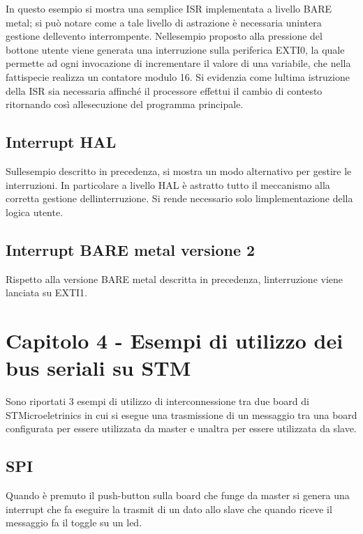 In questo esempio si mostra una semplice I\+SR implementata a livello B\+A\+RE metal; si può notare come a tale livello di astrazione è necessaria un\textquotesingle{}intera gestione dell\textquotesingle{}evento interrompente. Nell\textquotesingle{}esempio proposto alla pressione del bottone utente viene generata una interruzione sulla periferica E\+X\+T\+I0, la quale permette ad ogni invocazione di incrementare il valore di una variabile, che nella fattispecie realizza un contatore modulo 16. Si evidenzia come l\textquotesingle{}ultima istruzione della I\+SR sia necessaria affinché il processore effettui il cambio di contesto ritornando così all\textquotesingle{}esecuzione del programma principale. \hypertarget{index_thirthsecond}{}\subsection{Interrupt H\+AL}\label{index_thirthsecond}
Sull\textquotesingle{}esempio descritto in precedenza, si mostra un modo alternativo per gestire le interruzioni. In particolare a livello H\+AL è astratto tutto il meccanismo alla corretta gestione dell\textquotesingle{}interruzione. Si rende necessario solo l\textquotesingle{}implementazione della logica utente. \hypertarget{index_thirtthirth}{}\subsection{Interrupt B\+A\+R\+E metal versione 2}\label{index_thirtthirth}
Rispetto alla versione B\+A\+RE metal descritta in precedenza, l\textquotesingle{}interruzione viene lanciata su E\+X\+T\+I1.\hypertarget{index_fourth}{}\section{Capitolo 4 -\/  Esempi di utilizzo dei bus seriali su S\+TM}\label{index_fourth}
Sono riportati 3 esempi di utilizzo di interconnessione tra due board di S\+T\+Microeletrinics in cui si esegue una trasmissione di un messaggio tra una board configurata per essere utilizzata da master e un\textquotesingle{}altra per essere utilizzata da slave. \hypertarget{index_fourthone}{}\subsection{S\+PI}\label{index_fourthone}
Quando è premuto il push-\/button sulla board che funge da master si genera una interrupt che fa eseguire la trasmit di un dato allo slave che quando riceve il messaggio fa il toggle su un led.

